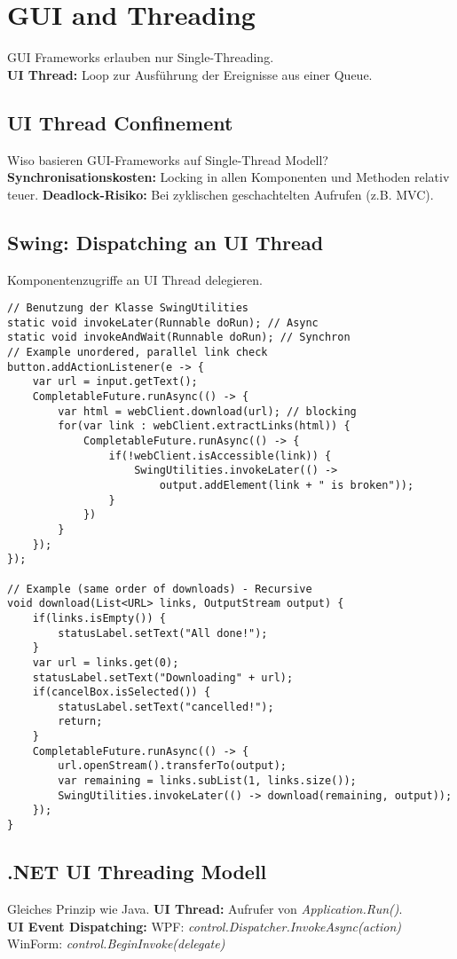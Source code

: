 \section{GUI and Threading}
GUI Frameworks erlauben nur Single-Threading. \\ 
\textbf{UI Thread:} Loop zur Ausführung der Ereignisse aus einer Queue.
\subsection{UI Thread Confinement}
Wiso basieren GUI-Frameworks auf Single-Thread Modell?\\
\textbf{Synchronisationskosten:} Locking in allen Komponenten und Methoden relativ teuer.
\textbf{Deadlock-Risiko:} Bei zyklischen geschachtelten Aufrufen (z.B. MVC).

\subsection{Swing: Dispatching an UI Thread}
Komponentenzugriffe an UI Thread delegieren.
\begin{lstlisting}
// Benutzung der Klasse SwingUtilities
static void invokeLater(Runnable doRun); // Async
static void invokeAndWait(Runnable doRun); // Synchron 
// Example unordered, parallel link check
button.addActionListener(e -> {
    var url = input.getText();
    CompletableFuture.runAsync(() -> {
        var html = webClient.download(url); // blocking
        for(var link : webClient.extractLinks(html)) {
            CompletableFuture.runAsync(() -> {
                if(!webClient.isAccessible(link)) {
                    SwingUtilities.invokeLater(() -> 
                        output.addElement(link + " is broken"));
                }
            })
        }
    });
});

// Example (same order of downloads) - Recursive
void download(List<URL> links, OutputStream output) {
    if(links.isEmpty()) {
        statusLabel.setText("All done!");
    }
    var url = links.get(0);
    statusLabel.setText("Downloading" + url);
    if(cancelBox.isSelected()) {
        statusLabel.setText("cancelled!");
        return;
    }
    CompletableFuture.runAsync(() -> {
        url.openStream().transferTo(output);
        var remaining = links.subList(1, links.size());
        SwingUtilities.invokeLater(() -> download(remaining, output));
    });
}
\end{lstlisting}

\subsection{.NET UI Threading Modell}
Gleiches Prinzip wie Java.
\textbf{UI Thread:} Aufrufer von \textit{Application.Run()}.\\ 
\textbf{UI Event Dispatching:}
WPF: \textit{control.Dispatcher.InvokeAsync(action)}\\ 
WinForm: \textit{control.BeginInvoke(delegate)}

